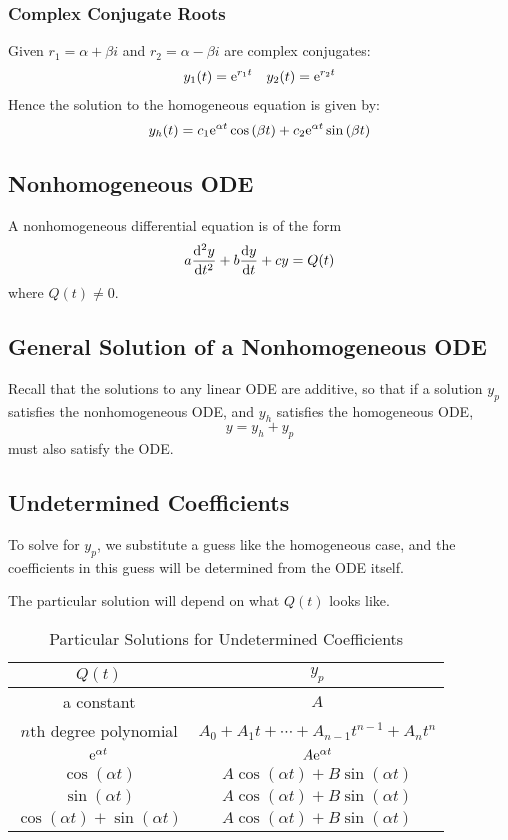 \documentclass{article}
\begin{document}
\subsubsection{Complex Conjugate Roots}
Given $r_1 = \alpha + \beta i$ and $r_2 = \alpha - \beta i$ are complex conjugates:
\begin{align*}
    y_1(t) = \mathrm{e}^{r_1t} & & y_2(t) = \mathrm{e}^{r_2t}
\end{align*}
Hence the solution to the homogeneous equation is given by:
\begin{equation*}
    y_h(t) = c_1\mathrm{e}^{\alpha t}\cos{\left( \beta t \right)} + c_2\mathrm{e}^{\alpha t}\sin{\left( \beta t \right)}
\end{equation*}
\subsection{Nonhomogeneous ODE}
A nonhomogeneous differential equation is of the form
\begin{equation*}
    a \dv[2]{y}{t} + b \dv{y}{t} + c y = Q(t)
\end{equation*}
where $Q(t)\neq 0$.
\subsection{General Solution of a Nonhomogeneous ODE}
Recall that the solutions to any linear ODE are additive, so that if a solution $y_p$ satisfies 
the nonhomogeneous ODE, and $y_h$ satisfies the homogeneous ODE,
\begin{equation*}
    y = y_h + y_p
\end{equation*} 
must also satisfy the ODE.
\subsection{Undetermined Coefficients}
To solve for $y_p$, we substitute a guess like the homogeneous case, and
the coefficients in this guess will be determined from the ODE itself.

The particular solution will depend on what $Q(t)$ looks like.
\begin{table}[H]
    \centering
    \begin{tabular}{c | c}
        \toprule
        $Q(t)$ & $y_p$ \\
        \midrule
        a constant & $A$ \\ 
        $n$th degree polynomial & $A_0 + A_1t + \cdots + A_{n-1}t^{n-1} + A_nt^n$ \\ 
        $\mathrm{e}^{\alpha t}$ & $A\mathrm{e}^{\alpha t}$ \\ 
        $\cos{\left( \alpha t \right)}$ & $A\cos{\left( \alpha t \right)} + B\sin{\left( \alpha t \right)}$ \\ 
        $\sin{\left( \alpha t \right)}$ & $A\cos{\left( \alpha t \right)} + B\sin{\left( \alpha t \right)}$ \\ 
        $\cos{\left( \alpha t \right)} + \sin{\left( \alpha t \right)}$ & $A\cos{\left( \alpha t \right)} + B\sin{\left( \alpha t \right)}$ \\ 
        \bottomrule
    \end{tabular}
    \caption{Particular Solutions for Undetermined Coefficients}
\end{table}
\end{document}
